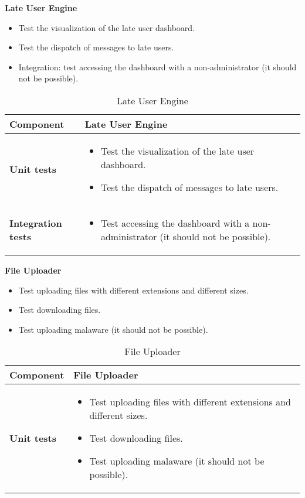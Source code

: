 \textbf{Late User Engine}

\begin{itemize}
\item Test the visualization of the late user dashboard.
\item Test the dispatch of messages to late users.
\item Integration: test accessing the dashboard with a non-administrator (it should not be possible).
\end{itemize}

\begin{table}[H]	
	\centering
	\def\arraystretch{1.5}
	\begin{tabular}{|m{4cm}|m{12cm}|}
		\hline
		\textbf{Component} & Late User Engine \\ \hline
		\textbf{Unit tests} & 
			\begin{itemize}
			\item Test the visualization of the late user dashboard.
			\item Test the dispatch of messages to late users.
			\end{itemize} \\ \hline
		\textbf{Integration tests} & 
			\begin{itemize}
			\item Test accessing the dashboard with a non-administrator (it should not be possible).
			\end{itemize} \\ \hline
	\end{tabular}
	\caption{Late User Engine}
\end{table}

\textbf{File Uploader}

\begin{itemize}
\item Test uploading files with different extensions and different sizes.
\item Test downloading files.
\item Test uploading malaware (it should not be possible).
\end{itemize}

\begin{table}[H]	
	\centering
	\def\arraystretch{1.5}
	\begin{tabular}{|m{4cm}|m{12cm}|}
		\hline
		\textbf{Component} & File Uploader \\ \hline
		\textbf{Unit tests} & 
			\begin{itemize}
			\item Test uploading files with different extensions and different sizes.
			\item Test downloading files.
			\item Test uploading malaware (it should not be possible).
			\end{itemize} \\ \hline
	\end{tabular}
	\caption{File Uploader}
\end{table}

